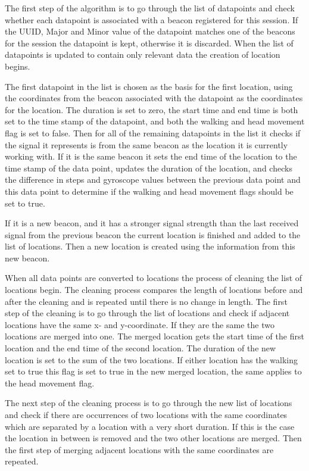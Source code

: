 \documentclass[../Main/thesis.tex]{subfiles}
\begin{document}
The first step of the algorithm is to go through the list of datapoints and check whether each datapoint is associated with a beacon registered for this session.
If the UUID, Major and Minor value of the datapoint matches one of the beacons for the session the datapoint is kept, otherwise it is discarded.
When the list of datapoints is updated to contain only relevant data the creation of location begins.

The first datapoint in the list is chosen as the basis for the first location, using the coordinates from the beacon associated with the datapoint as the coordinates for the location.
The duration is set to zero, the start time and end time is both set to the time stamp of the datapoint, and both the walking and head movement flag is set to false.
Then for all of the remaining datapoints in the list it checks if the signal it represents is from the same beacon as the location it is currently working with.
If it is the same beacon it sets the end time of the location to the time stamp of the data point, updates the duration of the location, and checks the difference in steps and gyroscope values between the previous data point and this data point to determine if the walking and head movement flags should be set to true.

If it is a new beacon, and it has a stronger signal strength than the last received signal from the previous beacon the current location is finished and added to the list of locations.
Then a new location is created using the information from this new beacon.

When all data points are converted to locations the process of cleaning the list of locations begin.
The cleaning process compares the length of locations before and after the cleaning and is repeated until there is no change in length.
The first step of the cleaning is to go through the list of locations and check if adjacent locations have the same x- and y-coordinate.
If they are the same the two locations are merged into one.
The merged location gets the start time of the first location and the end time of the second location.
The duration of the new location is set to the sum of the two locations.
If either location has the walking set to true this flag is set to true in the new merged location, the same applies to the head movement flag.

The next step of the cleaning process is to go through the new list of locations and check if there are occurrences of two locations with the same coordinates which are separated by a location with a very short duration.
If this is the case the location in between is removed and the two other locations are merged.
Then the first step of merging adjacent locations with the same coordinates are repeated.
\end{document}

